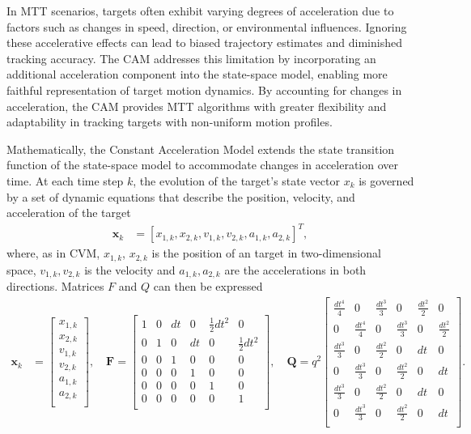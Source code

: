 In MTT scenarios, targets often exhibit varying degrees of acceleration due to factors such as changes in speed,
direction, or environmental influences. Ignoring these accelerative effects can lead to biased trajectory estimates and diminished tracking accuracy. The CAM addresses this limitation by incorporating an additional acceleration component into the state-space model, enabling more faithful representation of target motion dynamics. By accounting for changes in acceleration, the CAM provides MTT algorithms with greater flexibility and adaptability in tracking targets with non-uniform motion profiles.

Mathematically, the Constant Acceleration Model extends the state transition function of the state-space model to
accommodate changes in acceleration over time. At each time step $k$, the evolution of the target's state vector $x_k$ is governed by a set of dynamic equations that describe the position, velocity, and acceleration of the target
\begin{align}
    \mathbf{x}_k &= [x_{1,k}, x_{2,k}, v_{1,k}, v_{2,k}, a_{1,k}, a_{2,k}]^T,
\end{align}
where, as in CVM, $x_{1,k}$, $x_{2,k}$ is the position of an target in two-dimensional space, $v_{1,k}, v_{2,k}$ is
the velocity and $a_{1,k}, a_{2,k}$ are the accelerations in both directions. Matrices $F$ and $Q$ can then be expressed
\begin{align}
    \mathbf{x}_k &=
    \begin{bmatrix}
        x_{1,k} \\
        x_{2,k} \\
        v_{1,k} \\
        v_{2,k} \\
        a_{1,k} \\
        a_{2,k} \\
    \end{bmatrix},
    \quad \mathbf{F} =
    \begin{bmatrix}
        1 & 0 & dt & 0 & \frac{1}{2}dt^2 & 0\\
        0 & 1 & 0 & dt & 0 & \frac{1}{2}dt^2\\
        0 & 0 & 1 & 0 & 0 & 0\\
        0 & 0 & 0 & 1 & 0 & 0\\
        0 & 0 & 0 & 0 & 1 & 0\\
        0 & 0 & 0 & 0 & 0 & 1\\
    \end{bmatrix},
    \quad \mathbf{Q} = q^2
    \begin{bmatrix}
        \frac{dt^4}{4} & 0 & \frac{dt^3}{3} & 0 & \frac{dt^2}{2} & 0\\
        0 & \frac{dt^4}{4} & 0 & \frac{dt^3}{3} & 0 & \frac{dt^2}{2}\\
        \frac{dt^3}{3} & 0 & \frac{dt^2}{2} & 0 & dt & 0\\
        0 & \frac{dt^3}{3} & 0 & \frac{dt^2}{2} & 0 & dt \\
        \frac{dt^3}{3} & 0 & \frac{dt^2}{2} & 0 & dt & 0\\
        0 & \frac{dt^3}{3} & 0 & \frac{dt^2}{2} & 0 & dt \\
    \end{bmatrix}.
\end{align}
